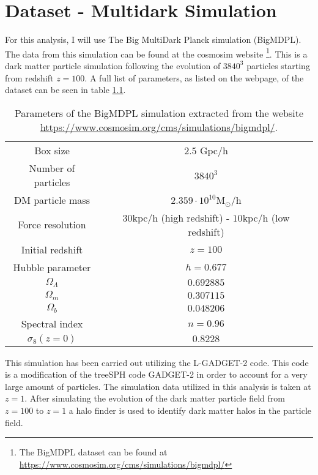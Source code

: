 \chapter{Dataset - Multidark Simulation}\label{sec:dataset}
For this analysis, I will use The Big MultiDark Planck simulation (BigMDPL)\cite{Multidark_dataset}. The data from this simulation can be found at the cosmosim website \footnote{The BigMDPL dataset can be found at \url{https://www.cosmosim.org/cms/simulations/bigmdpl/}}. This is a dark matter particle simulation following the evolution of $3840^3$ particles starting from redshift $z=100$. A full list of parameters, as listed on the webpage, of the dataset can be seen in table \ref{tab:cosmosimparameters}.
\begin{table}
    \begin{tabular}{| c | c |}
        \hline
        Box size & $2.5$ Gpc/h \\ 
        Number of particles& $3840^3$ \\  
        DM particle mass & $2.359\cdot10^{10} \mathrm{M}_\odot$/h \\
        Force resolution & $30$kpc/h (high redshift) - $10$kpc/h (low redshift)\\
        Initial redshift & $z = 100$\\
        Hubble parameter & $h=0.677$\\
        $\Omega_\Lambda$ & $0.692885$\\
        $\Omega_m$ & $ 0.307115$\\ 
        $ \Omega_b$ & $0.048206$ \\
        Spectral index & $n=0.96$\\
        $\sigma_8(z=0)$ & $0.8228$ \\
        \hline
    \end{tabular}
    \caption{\label{tab:cosmosimparameters}Parameters of the BigMDPL simulation extracted from the website \url{https://www.cosmosim.org/cms/simulations/bigmdpl/}.}
\end{table}
This simulation has been carried out utilizing the L-GADGET-2 code. This code is a modification of the treeSPH\cite{treesph} code GADGET-2\cite{springel2005} in order to account for a very large amount of particles. The simulation data utilized in this analysis is taken at $z=1$. After simulating the evolution of the dark matter particle field from $z=100$ to $z=1$ a halo finder is used to identify dark matter halos in the particle field.
